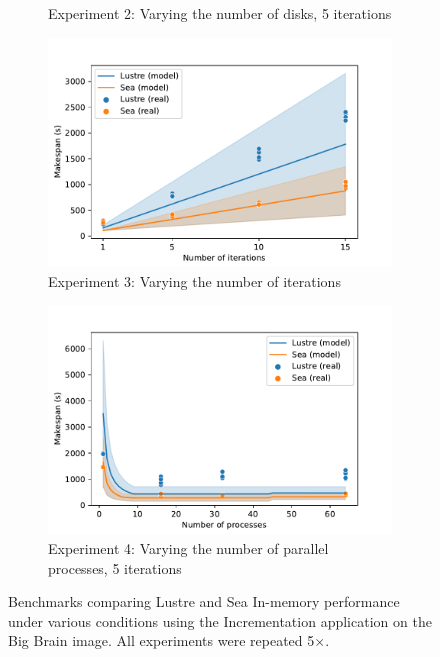 \begin{figure}
\begin{subfigure}{0.5\columnwidth}
        \caption{Experiment 2: Varying the number of disks, 5
        iterations}\label{fig:sea-comp:disks}
    \end{subfigure}
    \begin{subfigure}{0.5\columnwidth}
        \centering
        \captionsetup{width=.85\linewidth}
        \includegraphics[width=\linewidth]{figures/sea-comp/iterations.pdf}
        \caption{Experiment 3: Varying the number of
        iterations}\label{fig:sea-comp:iterations}
    \end{subfigure}
    \begin{subfigure}{0.5\columnwidth}
        \centering
        \captionsetup{width=.85\linewidth}
        \includegraphics[width=\linewidth]{figures/sea-comp/threads.pdf}
        \caption{Experiment 4: Varying the number of parallel processes, 5
        iterations}\label{fig:sea-comp:processes}
    \end{subfigure}
    \caption{Benchmarks comparing Lustre and Sea In-memory performance under
    various conditions using the Incrementation application on the Big Brain
    image. All experiments were repeated 5$\times$.}
    \label{fig:sea-comp:benchmarks}
    \end{figure}

